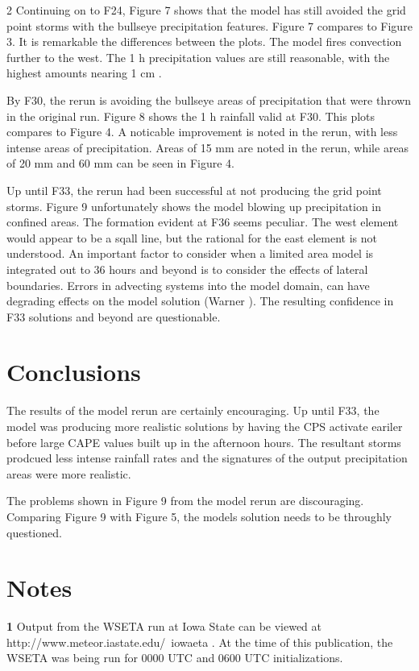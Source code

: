 \documentclass{article}
\begin{document}
\begin{multicols}{2}
Continuing on to F24, Figure 7 shows that the model has still avoided the grid point storms with the bullseye precipitation features.  Figure 7 compares to Figure 3.  It is remarkable the differences between the plots. The model fires convection further to the west.  The 1 h precipitation values are still reasonable, with the highest amounts nearing 1 cm \hr.

By F30, the rerun is avoiding the bullseye areas of precipitation that were thrown in the original run.  Figure 8 shows the 1 h rainfall valid at F30.  This plots compares to Figure 4.  A noticable improvement is noted in the rerun, with less intense areas of precipitation.  Areas of 15 mm are noted in the rerun, while areas of 20 mm and 60 mm can be seen in Figure 4.

Up until F33, the rerun had been successful at not producing the grid point storms.  Figure 9 unfortunately shows the model blowing up precipitation in confined areas.  The formation evident at F36 seems peculiar.  The west element would appear to be a sqall line, but the rational for the east element is not understood.  An important factor to consider when a limited area model is integrated out to 36 hours and beyond is to consider the effects of lateral boundaries.  Errors in advecting systems into the model domain, can have degrading effects on the model solution (Warner ).
The resulting confidence in F33 solutions and beyond are questionable.

\section{Conclusions}
The results of the model rerun are certainly encouraging.  Up until F33, the model was producing more realistic solutions by having the CPS activate eariler before large CAPE values built up in the afternoon hours.  The resultant storms prodcued less intense rainfall rates and the signatures of the output precipitation areas were more realistic.

The problems shown in Figure 9 from the model rerun are discouraging.  Comparing Figure 9 with Figure 5, the models solution needs to be throughly questioned.

\section{Notes}
\textbf{1}  Output from the WSETA run at Iowa State can be viewed at http://www.meteor.iastate.edu/~iowaeta .  At the time of this publication, the WSETA was being run for 0000 UTC and 0600 UTC initializations.


\end{multicols}
\end{document}
